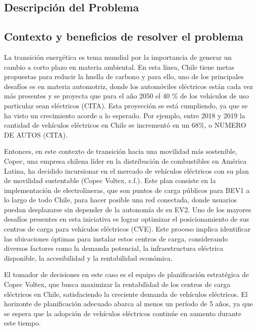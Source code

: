 \documentclass[letterpaper]{article}
\begin{document}
	\newpage
	\begin{flushleft}
		
		\section{Descripción del Problema}
		\subsection{Contexto y beneficios de resolver el problema}
		La transición energética es tema mundial por la importancia de generar un cambio a corto plazo en materia ambiental. En esta línea, Chile tiene metas propuestas para reducir la huella de carbono y para ello, uno de los principales desafíos es en materia automotriz, donde los automóviles eléctricos están cada vez más presentes y se proyecta que para el año 2050 el 40 \% de los vehículos de uso particular sean eléctricos (CITA).
		Esta proyección se está cumpliendo, ya que se ha visto un crecimiento acorde a lo esperado. Por ejemplo, entre 2018 y 2019 la cantidad de vehículos eléctricos en Chile se incrementó en un 68\%, o NUMERO DE AUTOS (CITA). 

		Entonces, en este contexto de transición hacia una movilidad más sostenible, Copec, una empresa chilena líder en la distribución de combustibles en América Latina, ha decidido incursionar en el mercado de vehículos eléctricos con su plan de movilidad sustentable (Copec Voltex, s.f.). Este plan consiste en la implementación de electrolineras, que son puntos de carga públicos para BEV1 a lo largo de todo Chile, para hacer posible una red conectada, donde usuarios puedan desplazarse sin depender de la autonomía de su EV2. 
		Uno de los mayores desafíos presentes en esta iniciativa es lograr optimizar el posicionamiento de sus centros de carga para vehículos eléctricos (CVE). Este proceso implica identificar las ubicaciones óptimas para instalar estos centros de carga, considerando diversos factores como la demanda potencial, la infraestructura eléctrica disponible, la accesibilidad y la rentabilidad económica. 

		El tomador de decisiones en este caso es el equipo de planificación estratégica de Copec Voltex, que busca maximizar la rentabilidad de los centros de carga eléctricos en Chile, satisfaciendo la creciente demanda de vehículos eléctricos. El horizonte de planificación adecuado abarca al menos un período de 5 años, ya que se espera que la adopción de vehículos eléctricos continúe en aumento durante este tiempo. 


\end{flushleft}
\end{document}
